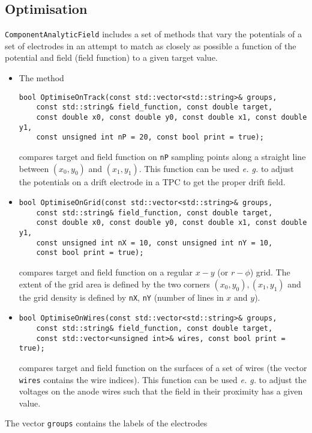 \subsection{Optimisation}
\texttt{ComponentAnalyticField} includes a set of methods that 
vary the potentials of a set of electrodes in an attempt to match as 
closely as possible a function of the potential and field 
(field function) to a given target value. 
\begin{itemize}
\item
The method 
\begin{lstlisting}
bool OptimiseOnTrack(const std::vector<std::string>& groups,
    const std::string& field_function, const double target,
    const double x0, const double y0, const double x1, const double y1,
    const unsigned int nP = 20, const bool print = true);
\end{lstlisting}
compares target and field function on \texttt{nP} sampling points 
along a straight line between $\left(x_{0}, y_{0}\right)$ and 
$\left(x_{1}, y_{1}\right)$.
This function can be used \textit{e. g.} to adjust the potentials on a 
drift electrode in a TPC to get the proper drift field.
\item 
\begin{lstlisting}
bool OptimiseOnGrid(const std::vector<std::string>& groups,
    const std::string& field_function, const double target,
    const double x0, const double y0, const double x1, const double y1,
    const unsigned int nX = 10, const unsigned int nY = 10,
    const bool print = true);
\end{lstlisting}
compares target and field function on a regular $x-y$ (or $r-\phi$) grid.
The extent of the grid area is defined by the two corners 
$\left(x_{0}, y_{0}\right), \left(x_{1}, y_{1}\right)$ and the grid 
density is defined by \texttt{nX}, \texttt{nY} 
(number of lines in $x$ and $y$).
\item
\begin{lstlisting}
bool OptimiseOnWires(const std::vector<std::string>& groups,
    const std::string& field_function, const double target,
    const std::vector<unsigned int>& wires, const bool print = true);
\end{lstlisting}
compares target and field function on the surfaces of a set of wires 
(the vector \texttt{wires} contains the wire indices).
This function can be used \textit{e. g.} to adjust the voltages on the  
anode wires such that the field in their proximity has a given value. 
\end{itemize}
The vector \texttt{groups} contains the labels of the electrodes 
